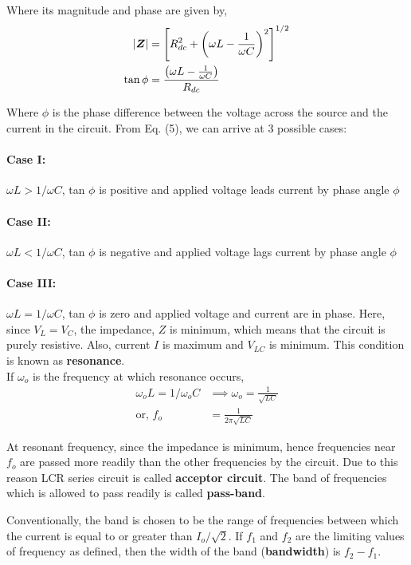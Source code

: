 Where its magnitude and phase are given by,
\begin{align}
    |\boldsymbol{Z}| &= \left[R^2_{dc} + \left(\omega L-\frac{1}{\omega C}\right)^2\right]^{1/2}\\
    \tan \phi &= \frac{\left(\omega L-\frac{1}{\omega C}\right)}{R_{dc}}
\end{align}

Where $\phi$ is the phase difference between the voltage across the source and the current in the circuit. From Eq. (5), we can arrive at 3 possible cases:

\paragraph*{\textbf{Case I:}} $\omega L > 1/\omega C$, tan $\phi$ is positive and applied voltage leads current by phase
angle $\phi$
\paragraph*{\textbf{Case II:}} $\omega L < 1/\omega C$, tan $\phi$ is negative and applied voltage lags current by phase
angle $\phi$
\paragraph*{\textbf{Case III:}} $\omega L = 1/\omega C$, tan $\phi$ is zero and applied voltage and current are in phase. Here, since $V_L = V_C$, the impedance, $Z$ is minimum, which means that the circuit is purely resistive. Also, current $I$ is maximum and $V_{LC}$ is minimum. This condition is known as \textbf{resonance}.\\

If $\omega_o$ is the frequency at which resonance occurs,
\begin{align}
    \omega_o L = 1/\omega_o C &\implies \omega_o = \frac{1}{\sqrt{LC}} \nonumber\\
    \text{or, } f_o &=  \frac{1}{2\pi\sqrt{LC}}
\end{align}

At resonant frequency, since the impedance is minimum, hence frequencies near $f_o$ are passed more readily than the other frequencies by the circuit. Due to this reason LCR series circuit is called \textbf{acceptor circuit}. The band of frequencies which is allowed to pass readily is called \textbf{pass-band}.

Conventionally, the band is chosen to be the range of frequencies between which the current is equal to or greater than $I_o/\sqrt{2}$. If $f_1$ and $f_2$ are the limiting
values of frequency as defined, then the width of the band (\textbf{bandwidth}) is $f_2 - f_1$.

